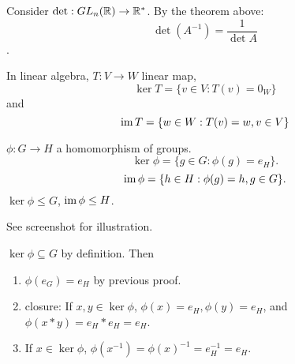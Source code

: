 \documentclass[class=article,crop=false]{standalone}
\begin{document}
\begin{eg}[]
	Consider $ \det: GL_n( \mathbb{R}) \to \mathbb{R}^* $. By the theorem above: 
	\[\det(A^{-1}) = \frac{1}{\det A}\]. 
\end{eg}

\begin{note}[]
	In linear algebra, $ T:V \to W$ linear map, \[\ker T=\{v \in V: T(v) = 0_W\} \] and \[\operatorname{im} T=\{w \in W: T(v)=w, v \in V\} \]
\end{note}
\begin{defn}
	$ \phi: G \to H$ a homomorphism of groups. 
	\[
		\ker \phi = \{g \in G : \phi(g) = e_H\} 
	.\] 
	\[
		\operatorname{im} \phi=\{ h \in H: \phi(g) =h, g \in G\} 
	.\] 
	$ \ker \phi \leq G$, $ \operatorname{im} \phi \leq H$.
\end{defn}
See screenshot for illustration. 
\begin{prf}
$ \ker \phi \subseteq G$ by definition. Then
\begin{enumerate}[label=\arabic*)]
	\item $ \phi(e_G) = e_H$ by previous proof.
	\item closure: If $ x,y \in \ker \phi$, $ \phi(x)=e_H, \phi(y) = e_H$, and $ \phi(x*y) = e_H * e_H = e_H$.
	\item If $ x \in \ker \phi$, $ \phi(x^{-1}) = \phi(x)^{-1} = e_H ^{-1} = e_H$.
\end{enumerate}
\end{prf}
\end{document}
